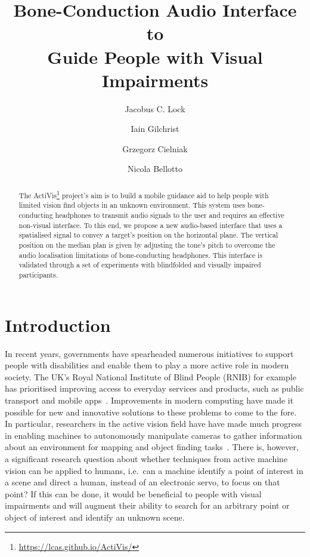 \documentclass{llncs}
\begin{document}
\title{Bone-Conduction Audio Interface to\\Guide People with Visual Impairments}

\author{Jacobus C. Lock \and 
Iain Gilchrist \and
Grzegorz Cielniak \and
Nicola Bellotto}



\maketitle
\setcounter{footnote}{0}

\begin{abstract}
  The ActiVis\footnote{\url{https://lcas.github.io/ActiVis/}} project's aim is to build a mobile guidance aid to help people with limited vision find objects in an unknown environment.
  This system uses bone-conducting headphones to transmit audio signals to the user and requires an effective non-visual interface.
  To this end, we propose a new audio-based interface that uses a spatialised signal to convey a target's position on the horizontal plane. 
  The vertical position on the median plan is given by adjusting the tone's pitch to overcome the audio localisation limitations of bone-conducting headphones. 
  This interface is validated through a set of experiments with blindfolded and visually impaired participants. 
\end{abstract} 

\section{Introduction}

In recent years, governments have spearheaded numerous initiatives to support people with disabilities and enable them to play a more active role in modern society.
The UK's Royal National Institute of Blind People (RNIB) for example has prioritised improving access to everyday services and products, such as public transport and mobile apps~\cite{rnib2016uk}.
Improvements in modern computing have made it possible for new and innovative solutions to these problems to come to the fore.
In particular, researchers in the active vision field have have made much progress in enabling machines to autonomously manipulate cameras to gather information about an environment for mapping and object finding tasks~\cite{bajcsy2018revisiting,lock2019active}.
There is, however, a significant research question about whether techniques from active machine vision can be applied to humans, i.e.\ can a machine identify a point of interest in a scene and direct a human, instead of an electronic servo, to focus on that point?
If this can be done, it would be beneficial to people with visual impairments and will augment their ability to search for an arbitrary point or object of interest and identify an unknown scene. 
\end{document}
